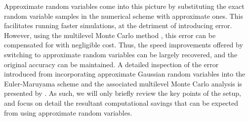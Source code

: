 \documentclass[manuscript,review]{acmart}
\begin{document}
Approximate random variables come into this picture by substituting the exact random variable samples in the numerical scheme with approximate ones. This facilitates running faster simulations, at the detriment of introducing error. However, using the multilevel Monte Carlo method \citep{giles2008multilevel}, this error can be compensated for with negligible cost. Thus, the speed improvements offered by switching to approximate random variables can be largely recovered, and the original accuracy can be maintained. A detailed inspection of the error introduced from incorporating approximate Gaussian random variables into the Euler-Maruyama scheme and the associated multilevel Monte Carlo analysis is presented by \citeauthor{giles2020approximate} \citep{giles2020approximate,sheridan2020nested}. As such, we will only briefly review the key points of the setup, and focus on detail the resultant computational savings that can be expected from using approximate random variables. 
\end{document}
